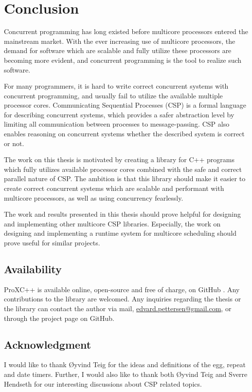 

\chapter{Conclusion}
\label{ch:conclusion}

Concurrent programming has long existed before multicore processors entered the mainstream market. With the ever increasing use of multicore processors, the demand for software which are scalable and fully utilize these processors are becoming more evident, and concurrent programming is the tool to realize such software.

For many programmers, it is hard to write correct concurrent systems with concurrent programming, and usually fail to utilize the available multiple processor cores. Communicating Sequential Processes (CSP) is a formal language for describing concurrent systems, which provides a safer abstraction level by limiting all communication between processes to message\hyp{}passing. CSP also enables reasoning on concurrent systems whether the described system is correct or not.

The work on this thesis is motivated by creating a library for C++ programs which fully utilizes available processor cores combined with the safe and correct parallel nature of CSP. The ambition is that this library should make it easier to create correct concurrent systems which are scalable and performant with multicore processors, as well as using concurrency fearlessly. 

The work and results presented in this thesis should prove helpful for designing and implementing other multicore CSP libraries. Especially, the work on designing and implementing a runtime system for multicore scheduling should prove useful for similar projects.




\section{Availability}

ProXC++ is available online, open\hyp{}source and free of charge, on GitHub \citep{pettersen2017proxcgithub}. Any contributions to the library are welcomed. Any inquiries regarding the thesis or the library can contact the author via mail, \href{mailto:edvard.pettersen@gmail.com}{edvard.pettersen@gmail.com}, or through the project page on GitHub.


\section{Acknowledgment}

I would like to thank Øyvind Teig for the ideas and definitions of the egg, repeat and date timers. Further, I would also like to thank both Øyvind Teig and Sverre Hendseth for our interesting discussions about CSP related topics.
